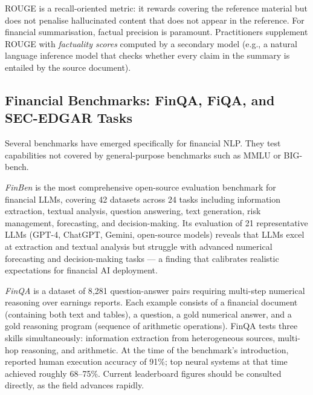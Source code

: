 \begin{deepdive}
ROUGE is a recall-oriented metric: it rewards covering the reference material
but does not penalise hallucinated content that does not appear in the reference.
For financial summarisation, factual precision is paramount.  Practitioners
supplement ROUGE with \emph{factuality scores} computed by a secondary model
(e.g., a natural language inference model that checks whether every claim in
the summary is entailed by the source document).

\end{deepdive}

\begin{context}

\subsection{Financial Benchmarks: FinQA, FiQA, and SEC-EDGAR Tasks}
\label{subsec:financial-benchmarks}

Several benchmarks have emerged specifically for financial NLP.  They test
capabilities not covered by general-purpose benchmarks such as MMLU or BIG-bench.

\emph{FinBen} \cite{xie2024finben} is the most comprehensive open-source evaluation
benchmark for financial LLMs, covering 42 datasets across 24 tasks including
information extraction, textual analysis, question answering, text generation,
risk management, forecasting, and decision-making.  Its evaluation of 21 representative
LLMs (GPT-4, ChatGPT, Gemini, open-source models) reveals that LLMs excel at
extraction and textual analysis but struggle with advanced numerical forecasting
and decision-making tasks --- a finding that calibrates realistic expectations
for financial AI deployment.

\emph{FinQA} \cite{chen2021finqa} is a dataset of 8{,}281 question-answer pairs
requiring multi-step numerical reasoning over earnings reports.  Each example
consists of a financial document (containing both text and tables), a question,
a gold numerical answer, and a gold reasoning program (sequence of arithmetic
operations).  FinQA tests three skills simultaneously: information extraction
from heterogeneous sources, multi-hop reasoning, and arithmetic.  At the time of the benchmark's introduction, \citet{chen2021finqa} reported human execution accuracy of 91\%; top neural systems at that time achieved roughly 68--75\%. Current leaderboard figures should be consulted directly, as the field advances rapidly.


\end{context}
